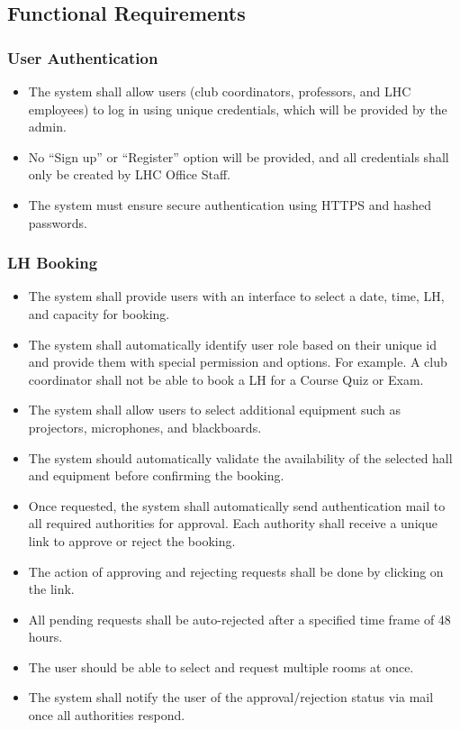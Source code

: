 \documentclass[a4paper,12pt]{article}
\begin{document}
\subsection{Functional Requirements} \label{subsec:functional}

\subsubsection{User Authentication}
\begin{itemize} 
    \item The system shall allow users (club coordinators, professors, and LHC employees) to log in using unique credentials, which will be provided by the admin.
    \item No “Sign up” or “Register” option will be provided, and all credentials shall only be created by LHC Office Staff.
    \item The system must ensure secure authentication using HTTPS and hashed passwords.
\end{itemize}

\subsubsection{LH Booking}
\begin{itemize} 
    \item The system shall provide users with an interface to select a date, time, LH, and capacity for booking.
    \item The system shall automatically identify user role based on their unique id and provide them with special permission and options. For example. A club coordinator shall not be able to book a LH for a Course Quiz or Exam.
    \item The system shall allow users to select additional equipment such as projectors, microphones, and blackboards.
    \item The system should automatically validate the availability of the selected hall and equipment before confirming the booking.
    \item Once requested, the system shall automatically send authentication mail to all required authorities for approval. Each authority shall receive a unique link to approve or reject the booking.
    \item The action of approving and rejecting requests shall be done by clicking on the link.
    \item All pending requests shall be auto-rejected after a specified time frame of 48 hours.
    \item The user should be able to select and request multiple rooms at once.
    \item The system shall notify the user of the approval/rejection status via mail once all authorities respond.
\end{itemize}
\end{document}
